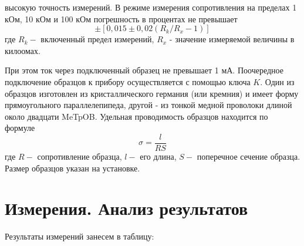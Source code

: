 \documentclass[a4paper, 12pt]{article}%
\begin{document}
высокую точность измерений. В режиме измерения сопротивления на пределах 1 кОм, 10 кОм и 100 кОм погрешность в процентах не превышает
$$
\pm\left[0,015 \pm 0,02\left(R_{k} / R_{x}-1\right)\right]
$$
где $R_{k}-$ включенный предел измерений, $R_{x}$ - значение измеряемой величины в килоомах.

При этом ток через подключенный образец не превышает 1 мА. Поочередное подключение образцов к прибору осуществляется с помощью ключа $K .$ Один из образцов изготовлен из кристаллического германия (или кремния) и имеет форму прямоугольного параллелепипеда, другой - из тонкой медной проволоки длиной около двадцати MeTpOB. Удельная проводимость образцов находится по формуле
$$
\sigma=\frac{l}{R S}
$$
где $R-$ сопротивление образца, $l-$ его длина, $S-$ поперечное сечение образца. Размер образцов указан на установке.
\section{Измерения. Анализ результатов}
Результаты измерений занесем в таблицу: 
\end{document}

